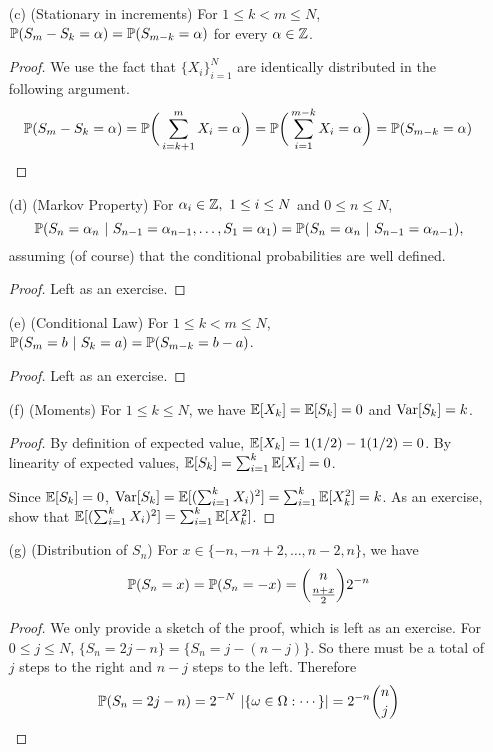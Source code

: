 \documentclass[main]{subfiles}
\begin{document}
\begin{obs}
\begin{enumerate}
            \item[(c)](Stationary in increments) For $ 1\le k<m\le N $, $ \P(S_m-S_k=\alpha)=\P(S_{m-k}=\alpha)$ for every $ \alpha\in\Z $.

            \begin{proof}
                We use the fact that $ \{X_i\}_{i=1}^N $ are identically distributed in the following argument. $$ \P(S_m-S_k=\alpha)=\P\bigg(\sum_{i=k+1}^mX_i=\alpha\bigg)=\P\bigg(\sum_{i=1}^{m-k}X_i=\alpha\bigg)=\P(S_{m-k}=\alpha) $$
            \end{proof}
            \item[(d)](Markov Property) For $ \alpha_i\in\Z,\ 1\le i\le N $ and $ 0\le n\le N $, \[ \P(S_n=\alpha_n\ |\ S_{n-1}=\alpha_{n-1}, \ldots, S_1=\alpha_1)=\P(S_n=\alpha_n\ |\ S_{n-1}=\alpha_{n-1}), \] assuming (of course) that the conditional probabilities are well defined.

            \begin{proof}
                Left as an exercise.
            \end{proof}

            \item[(e)](Conditional Law) For $ 1\le k<m\le N $, $ \P(S_m=b\ |\ S_k=a)=\P(S_{m-k}=b-a) $.

            \begin{proof}
                Left as an exercise.
            \end{proof}

            \item[(f)](Moments) For $ 1\le k\le N $, we have $ \E[X_k]=\E[S_k]=0 $ and $ \var[S_k]=k $.

            \begin{proof}
                By definition of expected value, $ \E[X_k]= 1(1/2) -1(1/2) =0 $. By linearity of expected values, $ \E[S_k]=\sum_{i=1}^k\E[X_i]=0 $.

                Since $ \E[S_k]=0 $, $ \var[S_k]=\E[(\sum_{i=1}^kX_i)^2]=\sum_{i=1}^k\E[X_k^2]=k$. As an exercise, show that $ \E[(\sum_{i=1}^kX_i)^2]=\sum_{i=1}^k\E[X_k^2] $.
            \end{proof}

            \item[(g)](Distribution of $ S_n $) For $ x\in\{-n, -n+2, \ldots, n-2, n\} $, we have \[\P(S_n=x)=\P(S_n=-x)=\binom{n}{\frac{n+x}{2}}2^{-n}\]

            \begin{proof}
                We only provide a sketch of the proof, which is left as an exercise. For $ 0\le j\le N $, $ \{S_n=2j-n\}=\{S_n=j-(n-j)\} $. So there must be a total of $ j $ steps to the right and $ n-j $ steps to the left. Therefore \[\P(S_n=2j-n)=2^{-N}\ |\{\o\in\O:\cdots\}|=2^{-n}\binom{n}{j}\]
            \end{proof}


\end{enumerate}
\end{obs}
\end{document}
